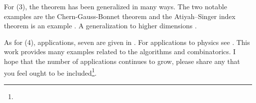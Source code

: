 For (3), the theorem has been generalized in many ways.
The two notable examples are the Chern-Gauss-Bonnet theorem\cite{chern_simple_1944} and
the Atiyah–Singer index theorem is an example  \cite{atiyah_index_1963}.
A generalization to higher dimensions \cite{guillemin_differential_2010}.


As for (4), applications, 
seven are given in \cite{doc76}.
For applications to physics see \cite{tirado-physics-apps,gibbons_applications_2008}.
This work provides many examples related to the algorithms and combinatorics. 
I hope that the number of applications continues to grow,
please share any that you feel
ought to be included\footnote{}.







